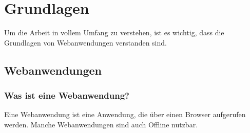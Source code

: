 \section{Grundlagen}\label{sec:grundlagen}
Um die Arbeit in vollem Umfang zu verstehen, ist es wichtig, dass die Grundlagen von Webanwendungen verstanden sind.
\subsection{Webanwendungen}\label{subsec:webanwendungen}

\subsubsection{Was ist eine Webanwendung?}
Eine Webanwendung ist eine Anwendung, die über einen Browser aufgerufen werden.
Manche Webanwendungen sind auch Offline nutzbar.

